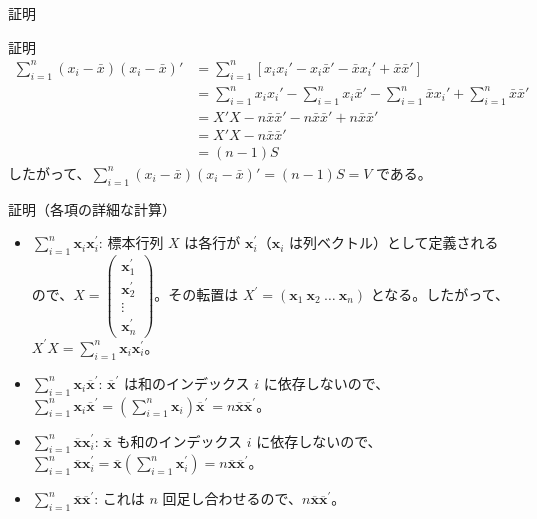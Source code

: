 \documentclass[aspectratio=169]{beamer}
\begin{document}
\begin{CJK}{UTF8}{min}
\begin{frame}{証明}
\begin{block}{証明}
\[
\begin{aligned}
\sum_{i=1}^n (x_i - \bar{x})(x_i - \bar{x})'
&= \sum_{i=1}^n \left[ x_i x_i' - x_i \bar{x}' - \bar{x} x_i' + \bar{x} \bar{x}' \right] \\
&= \sum_{i=1}^n x_i x_i' - \sum_{i=1}^n x_i \bar{x}' - \sum_{i=1}^n \bar{x} x_i' + \sum_{i=1}^n \bar{x} \bar{x}' \\
&= X'X - n\bar{x} \bar{x}' - n\bar{x} \bar{x}' + n\bar{x} \bar{x}' \\
&= X'X - n\bar{x} \bar{x}' \\
&= (n-1)S
\end{aligned}
\]
したがって、$\sum_{i=1}^n (x_i - \bar{x})(x_i - \bar{x})' = (n-1)S = V$ である。
\end{block}
\end{frame}

\begin{frame}{証明（各項の詳細な計算）}
\begin{itemize}
    \item $\sum_{i=1}^{n}\bm{x}_{i}\bm{x}_{i}^{\prime}$: 標本行列 $X$ は各行が $\bm{x}_{i}^{\prime}$（$\bm{x}_{i}$ は列ベクトル）として定義されるので、$X=\begin{pmatrix}\bm{x}_{1}^{\prime}\\ \bm{x}_{2}^{\prime}\\ \vdots\\ \bm{x}_{n}^{\prime}\end{pmatrix}$。その転置は $X^{\prime}=(\bm{x}_{1}\ \bm{x}_{2}\ \dots\ \bm{x}_{n})$ となる。したがって、$X^{\prime}X=\sum_{i=1}^{n}\bm{x}_{i}\bm{x}_{i}^{\prime}$。
    \item $\sum_{i=1}^{n}\bm{x}_{i}\overline{\bm{x}}^{\prime}$: $\overline{\bm{x}}^{\prime}$ は和のインデックス $i$ に依存しないので、$\sum_{i=1}^{n}\bm{x}_{i}\overline{\bm{x}}^{\prime} = (\sum_{i=1}^{n}\bm{x}_{i})\overline{\bm{x}}^{\prime} = n\overline{\bm{x}}\overline{\bm{x}}^{\prime}$。
    \item $\sum_{i=1}^{n}\overline{\bm{x}}\bm{x}_{i}^{\prime}$: $\overline{\bm{x}}$ も和のインデックス $i$ に依存しないので、$\sum_{i=1}^{n}\overline{\bm{x}}\bm{x}_{i}^{\prime} = \overline{\bm{x}}(\sum_{i=1}^{n}\bm{x}_{i}^{\prime}) = n\overline{\bm{x}}\overline{\bm{x}}^{\prime}$。
    \item $\sum_{i=1}^{n}\overline{\bm{x}}\overline{\bm{x}}^{\prime}$: これは $n$ 回足し合わせるので、$n\overline{\bm{x}}\overline{\bm{x}}^{\prime}$。
\end{itemize}
\end{frame}


\end{CJK}
\end{document}
